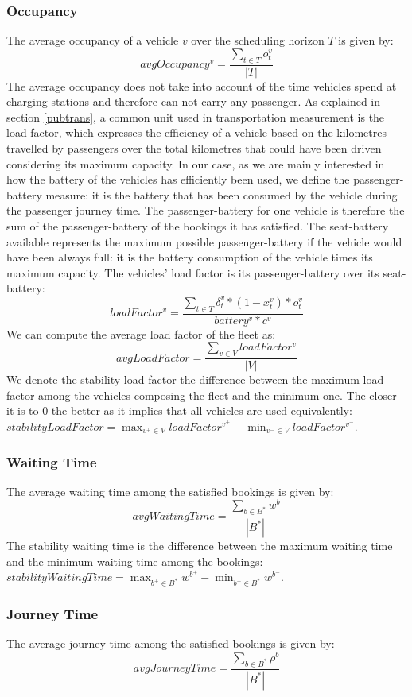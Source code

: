 \documentclass[12pt,a4paper]{article}
\begin{document}
\subsubsection*{Occupancy}
The average occupancy of a vehicle $v$ over the scheduling horizon $T$ is given by:
$$avgOccupancy^{v} = \frac{\sum_{t \in T}o^{v}_{t}}{|T|}$$
The average occupancy does not take into account of the time vehicles spend at charging stations and therefore can not carry any passenger. As explained in section \ref{pubtrans}, a common unit used in transportation  measurement is the load factor, which expresses the efficiency of a vehicle based on the kilometres travelled by passengers over the total kilometres that could have been driven considering its maximum capacity. In our case, as we are mainly interested in how the battery of the vehicles has efficiently been used, we define the passenger-battery measure: it is the battery that has been consumed by the vehicle during the passenger journey time. The passenger-battery for one vehicle is therefore the sum of the passenger-battery of the bookings it has satisfied. The seat-battery available represents the maximum possible passenger-battery if the vehicle would have been always full: it is the battery consumption of the vehicle times its maximum capacity. The vehicles' load factor is its passenger-battery over its seat-battery:
$$loadFactor^{v} = \frac{\sum_{t \in T} \delta^{v}_{t} * (1-x^{v}_{t}) * o^{v}_{t}}{battery^{v} * c^{v}}$$
We can compute the average load factor of the fleet as:
$$avgLoadFactor = \frac{\sum_{v \in V}loadFactor^{v}}{|V|}$$
We denote the stability load factor the difference between the maximum load factor among the vehicles composing the fleet and the minimum one. The closer it is to 0 the better as it implies that all vehicles are used equivalently: $stabilityLoadFactor = \max_{v^{+} \in V}{loadFactor^{v^{+}}} -  \min_{v^{-} \in V}{loadFactor^{v^{-}}}$.
\subsubsection*{Waiting Time}
The average waiting time among the satisfied bookings is given by: 
$$avgWaitingTime = \frac{\sum_{b \in B^{*}}w^{b}}{|B^{*}|} $$
The stability waiting time is the difference between the maximum waiting time and the minimum waiting time among the bookings:  $stabilityWaitingTime = \max_{b^{+} \in B^{*}}{w^{b^{+}}} -  \min_{b^{-} \in B^{*}}{w^{b^{-}}}$.
\subsubsection*{Journey Time}
The average journey time among the satisfied bookings is given by:
$$avgJourneyTime = \frac{\sum_{b \in B^{*}}\rho^{b}}{|B^{*}|} $$
\end{document}

